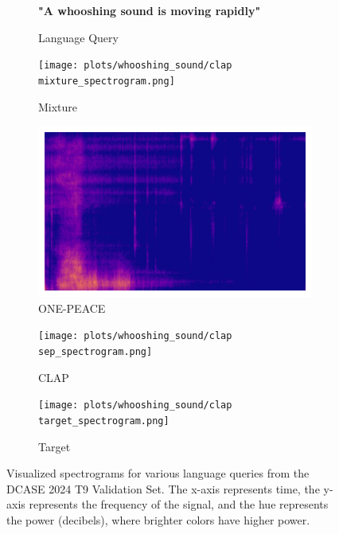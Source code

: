 \begin{figure}[!htbp]
    \begin{subfigure}[b]{0.185\textwidth}
        \centering
        \scriptsize\textbf{"A whooshing sound is moving rapidly"}
        \vspace{5.0mm}
        \caption*{Language Query}
    \end{subfigure}
    \begin{subfigure}[b]{0.185\textwidth}
        \centering
        \texttt{[image: plots/whooshing\_sound/clap mixture\_spectrogram.png]}
        \centering
        \caption*{Mixture}
    \end{subfigure}
    \begin{subfigure}[b]{0.185\textwidth}
        \centering
        \includegraphics[width=\textwidth]{plots/whooshing_sound/onepeace sep_spectrogram.png}
        \caption*{ONE-PEACE}
    \end{subfigure}
    \begin{subfigure}[b]{0.185\textwidth}
        \centering
        \texttt{[image: plots/whooshing\_sound/clap sep\_spectrogram.png]}
        \caption*{CLAP}
    \end{subfigure}
    \begin{subfigure}[b]{0.185\textwidth}
        \centering
        \texttt{[image: plots/whooshing\_sound/clap target\_spectrogram.png]}
        \caption*{Target}
    \end{subfigure}
    
    \caption{Visualized spectrograms for various language queries from the DCASE 2024 T9 Validation Set. The x-axis represents time, the y-axis represents the frequency of the signal, and the hue represents the power (decibels), where brighter colors have higher power.}
    
    \label{fig:separation_results}

\end{figure}
